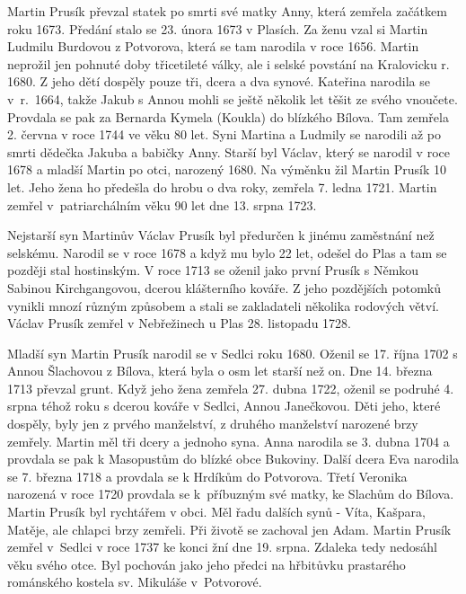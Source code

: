 \documentclass[../dejiny-rodu-prusiku.tex]{subfiles}
\begin{document}
Martin Prusík převzal statek po smrti své matky Anny, která zemřela začátkem roku 1673. Předání sta­lo se 23. února 1673 v Plasích. Za ženu vzal si Martin Ludmilu Burdovou z Potvorova, která se tam narodila v ro­ce 1656. Martin neprožil jen pohnuté doby třicetileté války, ale i selské povstání na Kralovicku r. 1680. Z jeho dětí dospěly pouze tři, dcera a dva synové. Ka­teřina narodila se v~r.~1664, takže Jakub s Annou mohli se ještě několik let těšit ze svého vnoučete. Provdala se pak za Bernarda Kymela (Koukla) do blízkého Bílova. Tam zemřela 2. června v roce 1744 ve věku 80 let. Syni Martina a Ludmily se narodili až po smrti dědečka Jaku­ba a babičky Anny. Starší byl Václav, který se narodil v roce 1678 a mladší Martin po otci, narozený 1680. Na výměnku žil Martin Prusík 10 let. Jeho žena ho předešla do hrobu o dva roky, zemřela 7. ledna 1721. Martin zemřel v~patriarchálním věku 90 let dne 13. srpna 1723.

Nejstarší syn Martinův Václav Prusík byl předurčen k jinému zaměstnání než selskému. Narodil se v roce 1678 a když mu bylo 22 let, odešel do Plas a tam se později stal hostinským. V roce 1713 se oženil jako první Prusík s Němkou Sabinou Kirchgangovou, dcerou klášterního kováře. Z jeho pozdějších potomků vynikli mnozí různým způsobem a stali se zakladateli několika rodových větví. Václav Prusík zemřel v Nebřežinech u Plas 28. listopadu 1728.

Mladší syn Martin Prusík narodil se v Sedlci roku 1680. Oženil se 17. října 1702 s Annou Šlachovou z Bílova, která byla o osm let starší než on. Dne 14. března 1713 převzal grunt. Když jeho žena zemřela 27. dubna 1722, oženil se podruhé 4. srpna téhož roku s dcerou kováře v Sedlci, Annou Janečkovou. Děti jeho, které dospěly, byly jen z prvého manželství, z druhého manželství narozené brzy zemřely. Martin měl tři dcery a jed­noho syna. Anna narodila se 3. dubna 1704 a provdala se pak k Masopustům do blízké obce Bukoviny. Další dcera Eva narodila se 7. března 1718 a provdala se k Hrdíkům do Potvorova. Třetí Veronika narozená v roce 1720 prov­dala se k~příbuzným své matky, ke Slachům do Bílova. Martin Prusík byl rychtářem v obci. Měl řadu dalších synů - Víta, Kašpara, Matěje, ale chlapci brzy zemřeli. Při životě se zachoval jen Adam. Martin Prusík zemřel v~Sedlci v roce 1737 ke konci žní dne 19. srpna. Zdaleka tedy ne­dosáhl věku svého otce. Byl pochován jako jeho předci na hřbitůvku prastarého románského kostela sv. Mikuláše v~Potvorové.
\end{document}
